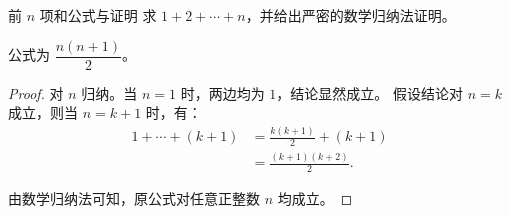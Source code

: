 \begin{problem}[10]{前 $n$ 项和公式与证明}
\label{sec:sum}
求 $1+2+\cdots+n$，并给出严密的数学归纳法证明。
\end{problem}

\begin{solution}
公式为 $\dfrac{n(n+1)}{2}$。
\begin{proof}
对 $n$ 归纳。当 $n=1$ 时，两边均为 $1$，结论显然成立。
假设结论对 $n=k$ 成立，则当 $n=k+1$ 时，有：
\[
\begin{aligned}
  1+\cdots+(k+1)
  &= \frac{k(k+1)}{2}+(k+1)\\[6pt]
  &= \frac{(k+1)(k+2)}{2}.
\end{aligned}
\]

由数学归纳法可知，原公式对任意正整数 $n$ 均成立。
\end{proof}
\end{solution}
